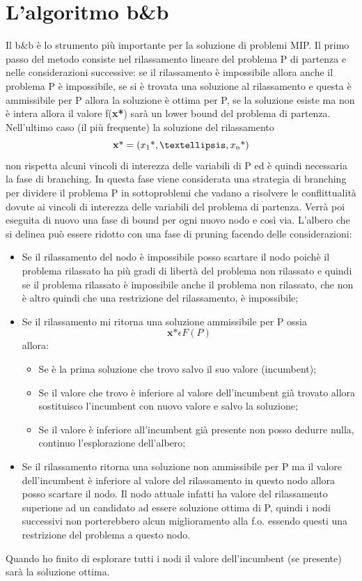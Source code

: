 \documentclass[12pt,a4paper,twoside,openright]{book}
\begin{document}
\section{L'algoritmo b\&b}
Il b\&b è lo strumento più importante per la soluzione di problemi MIP. Il primo passo del 
metodo consiste nel rilassamento lineare del problema P di partenza e nelle considerazioni
successive: se il rilassamento è impossibile allora anche il problema P è impossibile, 
se si è trovata una soluzione al rilassamento e questa è ammissibile per P allora la 
soluzione è ottima per P, se la soluzione esiste ma non è intera allora il valore f(\textbf{x\textup{*}}) 
sarà un lower bound del problema di partenza.
Nell’ultimo caso (il più frequente) la soluzione del rilassamento \[\textbf{x}\textup{*} = 
(x \textsubscript{1} \textup{*}, …, x\textsubscript{n} \textup{*})\] non rispetta alcuni 
vincoli di interezza delle variabili di P ed è quindi necessaria la fase di branching.
In questa fase viene considerata una strategia di branching per dividere il problema P 
in sottoproblemi che vadano a risolvere le conflittualità dovute ai vincoli di interezza 
delle variabili del problema di partenza. Verrà poi eseguita di nuovo una 
fase di bound per ogni nuovo nodo e così via.
L’albero che si delinea può essere ridotto con una fase di pruning facendo delle 
considerazioni:
\begin{itemize}
    \item Se il rilassamento del nodo è impossibile posso scartare il nodo poichè
        il problema rilassato ha più gradi di libertà del problema non rilassato e
        quindi se il problema rilassato è impossibile anche il problema non rilassato, che
        non è altro quindi che una restrizione del rilassamento, è impossibile;
    \item Se il rilassamento mi ritorna una soluzione ammissibile per P ossia 
    \[\textbf{x*} \epsilon F(P)\] allora:
        \begin{itemize}
            \item Se è la prima soluzione che trovo salvo il suo valore (incumbent);
            \item Se il valore che trovo è inferiore al valore dell’incumbent già 
                trovato allora sostituisco l’incumbent con nuovo valore e salvo la 
                soluzione;
            \item Se il valore è inferiore all'incumbent già presente non posso dedurre nulla,
                continuo l'esplorazione dell'albero;
        \end{itemize}
    \item Se il rilassamento ritorna una soluzione non ammissibile per P ma il valore 
        dell’incumbent è inferiore al valore del rilassamento in questo nodo allora posso
        scartare il nodo. Il nodo attuale infatti ha valore del rilassamento superione ad un
        candidato ad essere soluzione ottima di P, quindi i nodi successivi non porterebbero 
        alcun miglioramento alla f.o. essendo questi una restrizione del problema a questo nodo. 
\end{itemize}
Quando ho finito di esplorare tutti i nodi il valore dell’incumbent (se presente) sarà la soluzione ottima.
\end{document}
